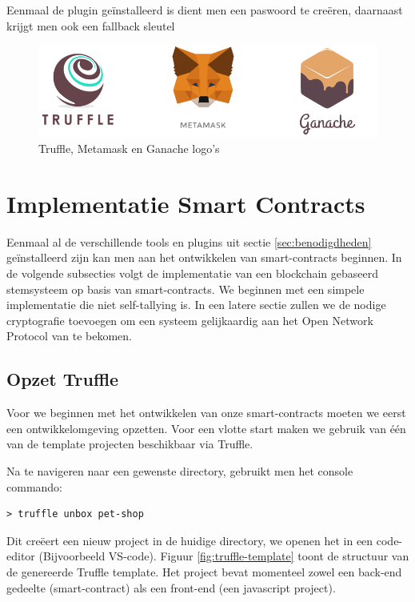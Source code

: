 	Eenmaal de plugin geïnstalleerd is dient men een paswoord te creëren, daarnaast krijgt men ook een fallback sleutel
	
	\begin{figure}
		\includegraphics[width=\linewidth]{img/metamask-truffle-ganache.png}
		\caption{Truffle, Metamask en Ganache logo's}
		\label{fig:metamask-truffle-ganache}
	\end{figure}
	\newpage
\section{Implementatie Smart Contracts}
	Eenmaal al de verschillende tools en plugins uit sectie \ref{sec:benodigdheden} geïnstalleerd zijn kan men aan het ontwikkelen van smart-contracts beginnen. In de volgende subsecties volgt de implementatie van een blockchain gebaseerd stemsysteem op basis van smart-contracts. We beginnen met een simpele implementatie die niet self-tallying is. In een latere sectie zullen we de nodige cryptografie toevoegen om een systeem gelijkaardig aan het Open Network Protocol van  \textcite{McCorry2017} te bekomen.
	\subsection{Opzet Truffle}
	Voor we beginnen met het ontwikkelen van onze smart-contracts moeten we eerst een ontwikkelomgeving opzetten. Voor een vlotte start maken we gebruik van één van de template projecten beschikbaar via Truffle. 
	
	Na te navigeren naar een gewenste directory, gebruikt men het console commando: 
	 \lstset{language=bash}
	\begin{lstlisting}[numbers=none]
	> truffle unbox pet-shop
	\end{lstlisting}
	
	Dit creëert een nieuw project in de huidige directory, we openen het in een code-editor (Bijvoorbeeld VS-code). Figuur \ref{fig:truffle-template} toont de structuur van de genereerde Truffle template. Het project bevat momenteel zowel een back-end gedeelte (smart-contract) als een front-end (een javascript project). 
	
